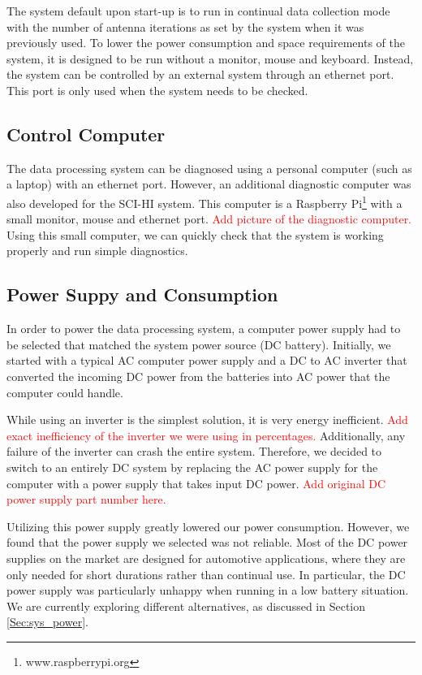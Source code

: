 The system default upon start-up is to run in continual data collection mode with the number of antenna iterations as set by the system when it was previously used. To lower the power consumption and space requirements of the system, it is designed to be run without a monitor, mouse and keyboard. Instead, the system can be controlled by an external system through an ethernet port. This port is only used when the system needs to be checked.

\subsection{Control Computer}
The data processing system can be diagnosed using a personal computer (such as a laptop) with an ethernet port. However, an additional diagnostic computer was also developed for the SCI-HI system. This computer is a Raspberry Pi\footnote{www.raspberrypi.org} with a small monitor, mouse and ethernet port. \textcolor{red}{Add picture of the diagnostic computer.} Using this small computer, we can quickly check that the system is working properly and run simple diagnostics.

\subsection{Power Suppy and Consumption}
In order to power the data processing system, a computer power supply had to be selected that matched the system power source (DC battery). Initially, we started with a typical AC computer power supply and a DC to AC inverter that converted the incoming DC power from the batteries into AC power that the computer could handle. 

While using an inverter is the simplest solution, it is very energy inefficient.  \textcolor{red}{Add exact inefficiency of the inverter we were using in percentages.} Additionally, any failure of the inverter can crash the entire system. Therefore, we decided to switch to an entirely DC system by replacing the AC power supply for the computer with a power supply that takes input DC power. \textcolor{red}{Add original DC power supply part number here.} 

Utilizing this power supply greatly lowered our power consumption. However, we found that the power supply we selected was not reliable. Most of the DC power supplies on the market are designed for automotive applications, where they are only needed for short durations rather than continual use. In particular, the DC power supply was particularly unhappy when running in a low battery situation. We are currently exploring different alternatives, as discussed in Section \ref{Sec:sys_power}. 

